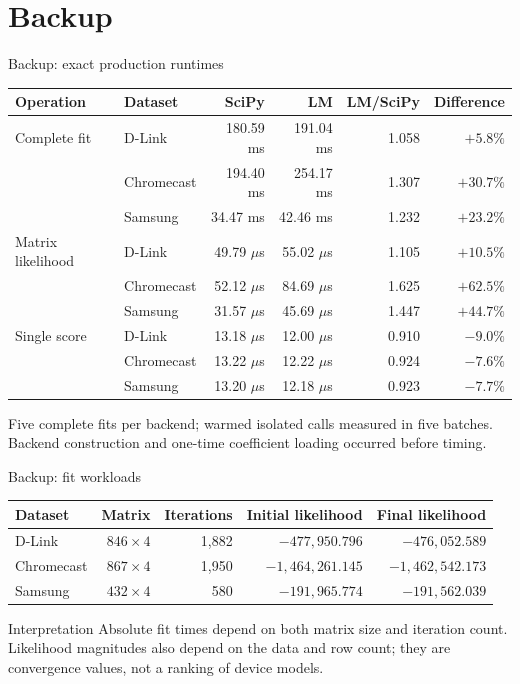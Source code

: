 \documentclass[aspectratio=169,10pt]{beamer}
\begin{document}
\appendix
\section{Backup}

\begin{frame}{Backup: exact production runtimes}
\centering
\scriptsize
\begin{tabular}{llrrrr}
\toprule
Operation & Dataset & SciPy & LM & LM/SciPy & Difference \\
\midrule
Complete fit & D-Link & 180.59 ms & 191.04 ms & 1.058 & $+5.8\%$ \\
& Chromecast & 194.40 ms & 254.17 ms & 1.307 & $+30.7\%$ \\
& Samsung & 34.47 ms & 42.46 ms & 1.232 & $+23.2\%$ \\
\addlinespace
Matrix likelihood & D-Link & 49.79 $\mu$s & 55.02 $\mu$s & 1.105 & $+10.5\%$ \\
& Chromecast & 52.12 $\mu$s & 84.69 $\mu$s & 1.625 & $+62.5\%$ \\
& Samsung & 31.57 $\mu$s & 45.69 $\mu$s & 1.447 & $+44.7\%$ \\
\addlinespace
Single score & D-Link & 13.18 $\mu$s & 12.00 $\mu$s & 0.910 & $-9.0\%$ \\
& Chromecast & 13.22 $\mu$s & 12.22 $\mu$s & 0.924 & $-7.6\%$ \\
& Samsung & 13.20 $\mu$s & 12.18 $\mu$s & 0.923 & $-7.7\%$ \\
\bottomrule
\end{tabular}

\vspace{0.55cm}
Five complete fits per backend; warmed isolated calls measured in five batches.
Backend construction and one-time coefficient loading occurred before timing.
\end{frame}

\begin{frame}{Backup: fit workloads}
\centering
\small
\begin{tabular}{lrrrr}
\toprule
Dataset & Matrix & Iterations & Initial likelihood & Final likelihood \\
\midrule
D-Link & $846\times4$ & 1,882 & $-477{,}950.796$ & $-476{,}052.589$ \\
Chromecast & $867\times4$ & 1,950 & $-1{,}464{,}261.145$ & $-1{,}462{,}542.173$ \\
Samsung & $432\times4$ & 580 & $-191{,}965.774$ & $-191{,}562.039$ \\
\bottomrule
\end{tabular}

\vspace{0.60cm}
\begin{alertblock}{Interpretation}
Absolute fit times depend on both matrix size and iteration count. Likelihood
magnitudes also depend on the data and row count; they are convergence values,
not a ranking of device models.
\end{alertblock}
\end{frame}
\end{document}
